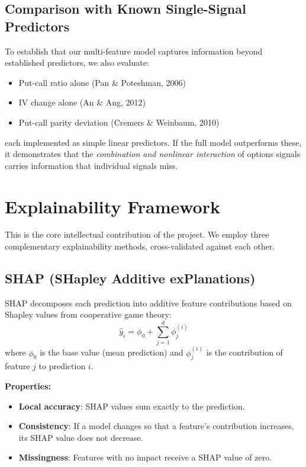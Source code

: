 \documentclass[11pt,a4paper]{article}
\begin{document}
\subsection{Comparison with Known Single-Signal Predictors}

To establish that our multi-feature model captures information beyond established predictors, we also evaluate:
\begin{itemize}[nosep]
    \item Put-call ratio alone (Pan \& Poteshman, 2006)
    \item IV change alone (An \& Ang, 2012)
    \item Put-call parity deviation (Cremers \& Weinbaum, 2010)
\end{itemize}
each implemented as simple linear predictors. If the full model outperforms these, it demonstrates that the \emph{combination and nonlinear interaction} of options signals carries information that individual signals miss.


\section{Explainability Framework}

This is the core intellectual contribution of the project. We employ three complementary explainability methods, cross-validated against each other.

\subsection{SHAP (SHapley Additive exPlanations)}

SHAP decomposes each prediction into additive feature contributions based on Shapley values from cooperative game theory:
\begin{equation}
\hat{y}_i = \phi_0 + \sum_{j=1}^{d} \phi_j^{(i)}
\end{equation}
where $\phi_0$ is the base value (mean prediction) and $\phi_j^{(i)}$ is the contribution of feature $j$ to prediction $i$.

\textbf{Properties:}
\begin{itemize}[nosep]
    \item \textbf{Local accuracy}: SHAP values sum exactly to the prediction.
    \item \textbf{Consistency}: If a model changes so that a feature's contribution increases, its SHAP value does not decrease.
    \item \textbf{Missingness}: Features with no impact receive a SHAP value of zero.
\end{itemize}
\end{document}
